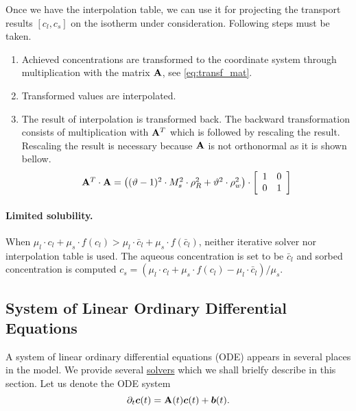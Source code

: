 Once we have the interpolation table, we can use it for projecting the transport results ${[c_l,c_s]}$ on the 
isotherm under consideration. Following steps must be taken.
\begin{enumerate}
 \item Achieved concentrations are transformed to the coordinate system through multiplication with the 
       matrix ${\bf A}$, see \eqref{eq:transf_mat}.
 \item Transformed values are interpolated.
 \item The result of interpolation is transformed back. The backward transformation consists of multiplication 
       with ${\bf A}^T$ which is followed by rescaling the result. Rescaling the result is necessary because  
       ${\bf A}$ is not orthonormal as it is shown bellow.
 \[
 \begin{array}{l}
 {\bf A}^T\cdot{\bf A} =
  \left((\vartheta - 1)^2\cdot M_s^2\cdot \rho_R^2 + \vartheta^2\cdot \rho_w^2\right)\cdot\left[\begin{array}{cc}
    1 & 0\\
    0 & 1
  \end{array}\right]
  \end{array}
 \]
\end{enumerate}


\paragraph{Limited solubility.} When $\mu_l\cdot c_l + \mu_s\cdot f(c_l) > \mu_l\cdot \bar{c}_l + \mu_s\cdot f(\bar{c}_l)$, neither iterative 
solver nor interpolation table is used. The aqueous concentration is set to be $\bar{c}_l$ and sorbed 
concentration is computed $c_s = (\mu_l\cdot c_l + \mu_s\cdot f(c_l) - \mu_l\cdot \bar{c}_l)/\mu_s$.

\subsection{System of Linear Ordinary Differential Equations}
\label{sec:num_slode}

A system of linear ordinary differential equations (ODE) appears in several places in the model. We provide 
several \hyperlink{IT::LinearODESolver}{solvers} which we shall brielfy describe in this section. Let us denote 
the ODE system
\[
  \partial_t \mathbf{\boldsymbol{c}}(t) = \mathbf{A}(t) \mathbf{\boldsymbol{c}}(t) + \mathbf{\boldsymbol{b}}(t).
\]

